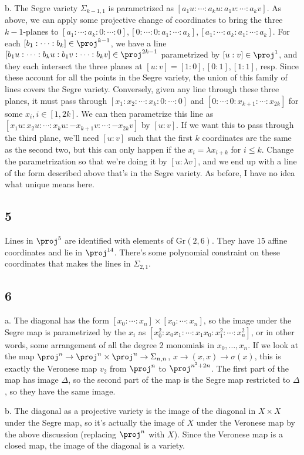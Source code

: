 \documentclass{article}
\begin{document}
b. The Segre variety $\Sigma_{k-1,1}$ is parametrized as $[a_1u:\cdots:a_{k}u:a_1v:\cdots:a_kv]$. As above, we can apply some projective change of coordinates to bring the three $k-1$-planes to $[a_1:\cdots:a_k:0:\cdots:0], [0:\cdots:0:a_1:\cdots:a_k],[a_1:\cdots:a_k:a_1:\cdots:a_k]$. For each $[b_1:\cdots:b_k]\in\proj^{k-1}$, we have a line $[b_1u:\cdots:b_{k}u:b_1v:\cdots:b_kv]\in\proj^{2k-1}$ parametrized by $[u:v]\in\proj^1$, and they each intersect the three planes at $[u:v]=[1:0],[0:1],[1:1]$, resp. Since these account for all the points in the Segre variety, the union of this family of lines covers the Segre variety. Conversely, given any line through these three planes, it must pass through $[x_1:x_2:\cdots:x_k:0:\cdots:0]$ and $[0:\cdots:0:x_{k+1}:\cdots:x_{2k}]$ for some $x_i,i\in[1,2k]$. We can then parametrize this line as $[x_1u:x_2u:\cdots:x_ku:-x_{k+1}v:\cdots:-x_{2k}v]$ by $[u:v]$. If we want this to pass through the third plane, we'll need $[u:v]$ such that the first $k$ coordinates are the same as the second two, but this can only happen if the $x_i=\lambda x_{i+k}$ for $i\leq k$. Change the parametrization so that we're doing it by $[u:\lambda v]$, and we end up with a line of the form described above that's in the Segre variety. As before, I have no idea what unique means here.

\subsection*{5}
Lines in $\proj^5$ are identified with elements of Gr$(2,6)$. They have $15$ affine coordinates and lie in $\proj^{14}$. There's some polynomial constraint on these coordinates that makes the lines in $\Sigma_{2,1}$. 
\subsection*{6}
a. The diagonal has the form $[x_0:\cdots:x_n]\times[x_0:\cdots:x_n]$, so the image under the Segre map is parametrized by the $x_i$ as $[x_0^2:x_0x_1:\cdots:x_1x_0:x_1^2:\cdots:x_n^2]$, or in other words, some arrangement of all the degree 2 monomials in $x_0,\ldots,x_n$. If we look at the map $\proj^n\to\proj^n\times\proj^n\to\Sigma_{n,n}$, $x\to(x,x)\to\sigma(x)$, this is exactly the Veronese map $v_2$ from $\proj^n$ to $\proj^{n^2+2n}$. The first part of the map has image $\Delta$, so the second part of the map is the Segre map restricted to $\Delta$, so they have the same image.

b. The diagonal as a projective variety is the image of the diagonal in $X\times X$ under the Segre map, so it's actually the image of $X$ under the Veronese map by the above discussion (replacing $\proj^n$ with $X$). Since the Veronese map is a closed map, the image of the diagonal is a variety.
\end{document}

